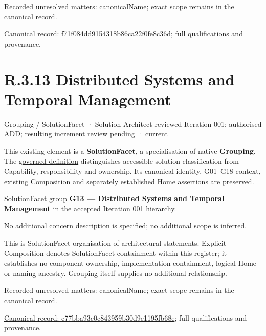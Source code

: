 {\small Recorded unresolved matters: canonicalName; exact scope remains in the canonical record.}\par
{\footnotesize \href{../../../../../../../continuum/grouping/f71f084dd9154318b86ca22f0fe8c36d.md}{Canonical record: f71f084dd9154318b86ca22f0fe8c36d}; full qualifications and provenance.}\par
\section*{R.3.13 Distributed Systems and Temporal Management}
\label{navigation:R.3.13}

\label{element:c77bba93c0c843959b30d9e1195fb68e}
{\small Grouping / SolutionFacet · Solution Architect-reviewed Iteration 001; authorised ADD; resulting increment review pending · current}\par

This existing element is a \textbf{SolutionFacet}, a specialisation of native
\textbf{Grouping}. The \href{\detokenize{../../../../../../../governance/continuum-representation.md#solutionfacet-classification--1119-candidate}}{governed definition}
distinguishes accessible solution classification from Capability, responsibility
and ownership. Its canonical identity, G01–G18 context, existing Composition
and separately established Home assertions are preserved.



SolutionFacet group \textbf{G13 — Distributed Systems and Temporal Management} in the accepted Iteration 001 hierarchy.



No additional concern description is specified; no additional scope is inferred.



This is SolutionFacet organisation of architectural statements. Explicit Composition denotes SolutionFacet containment within this register; it establishes no component ownership, implementation containment, logical Home or naming ancestry. Grouping itself supplies no additional relationship.


{\small Recorded unresolved matters: canonicalName; exact scope remains in the canonical record.}\par
{\footnotesize \href{../../../../../../../continuum/grouping/c77bba93c0c843959b30d9e1195fb68e.md}{Canonical record: c77bba93c0c843959b30d9e1195fb68e}; full qualifications and provenance.}\par
